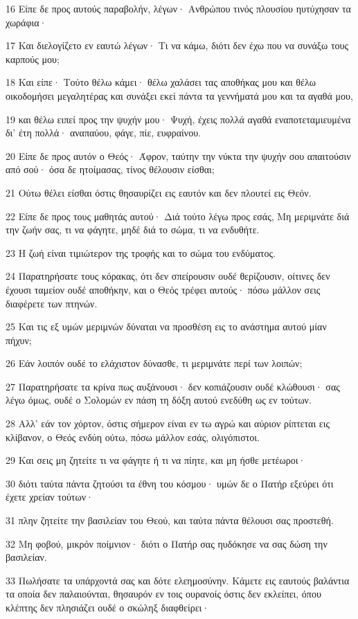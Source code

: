 \par 16 Είπε δε προς αυτούς παραβολήν, λέγων· Ανθρώπου τινός πλουσίου ηυτύχησαν τα χωράφια·
\par 17 Και διελογίζετο εν εαυτώ λέγων· Τι να κάμω, διότι δεν έχω που να συνάξω τους καρπούς μου;
\par 18 Και είπε· Τούτο θέλω κάμει· θέλω χαλάσει τας αποθήκας μου και θέλω οικοδομήσει μεγαλητέρας και συνάξει εκεί πάντα τα γεννήματά μου και τα αγαθά μου,
\par 19 και θέλω ειπεί προς την ψυχήν μου· Ψυχή, έχεις πολλά αγαθά εναποτεταμιευμένα δι' έτη πολλά· αναπαύου, φάγε, πίε, ευφραίνου.
\par 20 Είπε δε προς αυτόν ο Θεός· Άφρον, ταύτην την νύκτα την ψυχήν σου απαιτούσιν από σού· όσα δε ητοίμασας, τίνος θέλουσιν είσθαι;
\par 21 Ούτω θέλει είσθαι όστις θησαυρίζει εις εαυτόν και δεν πλουτεί εις Θεόν.
\par 22 Είπε δε προς τους μαθητάς αυτού· Διά τούτο λέγω προς εσάς, Μη μεριμνάτε διά την ζωήν σας, τι να φάγητε, μηδέ διά το σώμα, τι να ενδυθήτε.
\par 23 Η ζωή είναι τιμιώτερον της τροφής και το σώμα του ενδύματος.
\par 24 Παρατηρήσατε τους κόρακας, ότι δεν σπείρουσιν ουδέ θερίζουσιν, οίτινες δεν έχουσι ταμείον ουδέ αποθήκην, και ο Θεός τρέφει αυτούς· πόσω μάλλον σεις διαφέρετε των πτηνών.
\par 25 Και τις εξ υμών μεριμνών δύναται να προσθέση εις το ανάστημα αυτού μίαν πήχυν;
\par 26 Εάν λοιπόν ουδέ το ελάχιστον δύνασθε, τι μεριμνάτε περί των λοιπών;
\par 27 Παρατηρήσατε τα κρίνα πως αυξάνουσι· δεν κοπιάζουσιν ουδέ κλώθουσι· σας λέγω όμως, ουδέ ο Σολομών εν πάση τη δόξη αυτού ενεδύθη ως εν τούτων.
\par 28 Αλλ' εάν τον χόρτον, όστις σήμερον είναι εν τω αγρώ και αύριον ρίπτεται εις κλίβανον, ο Θεός ενδύη ούτω, πόσω μάλλον εσάς, ολιγόπιστοι.
\par 29 Και σεις μη ζητείτε τι να φάγητε ή τι να πίητε, και μη ήσθε μετέωροι·
\par 30 διότι ταύτα πάντα ζητούσι τα έθνη του κόσμου· υμών δε ο Πατήρ εξεύρει ότι έχετε χρείαν τούτων·
\par 31 πλην ζητείτε την βασιλείαν του Θεού, και ταύτα πάντα θέλουσι σας προστεθή.
\par 32 Μη φοβού, μικρόν ποίμνιον· διότι ο Πατήρ σας ηυδόκησε να σας δώση την βασιλείαν.
\par 33 Πωλήσατε τα υπάρχοντά σας και δότε ελεημοσύνην. Κάμετε εις εαυτούς βαλάντια τα οποία δεν παλαιούνται, θησαυρόν εν τοις ουρανοίς όστις δεν εκλείπει, όπου κλέπτης δεν πλησιάζει ουδέ ο σκώληξ διαφθείρει·
